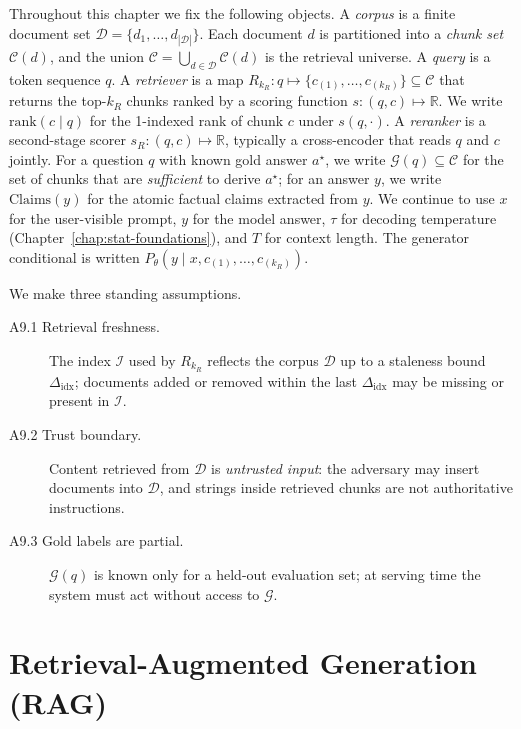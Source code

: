 \begin{notationbox}
Throughout this chapter we fix the following objects. A
\emph{corpus} is a finite document set $\mathcal{D} = \{d_1, \dots, d_{|\mathcal{D}|}\}$.
Each document $d$ is partitioned into a \emph{chunk set}
$\mathcal{C}(d)$, and the union $\mathcal{C} = \bigcup_{d \in \mathcal{D}} \mathcal{C}(d)$
is the retrieval universe. A \emph{query} is a token sequence $q$.
A \emph{retriever} is a map $R_{k_R} : q \mapsto
\{c_{(1)}, \dots, c_{(k_R)}\} \subseteq \mathcal{C}$ that returns
the top-$k_R$ chunks ranked by a scoring function
$s : (q, c) \mapsto \mathbb{R}$. We write $\mathrm{rank}(c \mid q)$ for
the 1-indexed rank of chunk $c$ under $s(q, \cdot)$. A
\emph{reranker} is a second-stage scorer
$s_R : (q, c) \mapsto \mathbb{R}$, typically a cross-encoder that
reads $q$ and $c$ jointly. For a question $q$ with known gold
answer $a^\star$, we write $\mathcal{G}(q) \subseteq \mathcal{C}$ for the
set of chunks that are \emph{sufficient} to derive $a^\star$; for
an answer $y$, we write $\mathrm{Claims}(y)$ for the atomic
factual claims extracted from $y$. We continue to use $x$ for the
user-visible prompt, $y$ for the model answer, $\tau$ for decoding
temperature (Chapter~\ref{chap:stat-foundations}), and $T$ for context length. The generator
conditional is written $P_\theta(y \mid x, c_{(1)}, \dots, c_{(k_R)})$.

We make three standing assumptions.
\begin{description}
  \item[A9.1 Retrieval freshness.] The index $\mathcal{I}$ used by $R_{k_R}$
    reflects the corpus $\mathcal{D}$ up to a staleness bound
    $\Delta_\mathrm{idx}$; documents added or removed within the last
    $\Delta_\mathrm{idx}$ may be missing or present in $\mathcal{I}$.
  \item[A9.2 Trust boundary.] Content retrieved from $\mathcal{D}$ is
    \emph{untrusted input}: the adversary may insert documents into
    $\mathcal{D}$, and strings inside retrieved chunks are not
    authoritative instructions.
  \item[A9.3 Gold labels are partial.] $\mathcal{G}(q)$ is known only for
    a held-out evaluation set; at serving time the system must act
    without access to $\mathcal{G}$.
\end{description}
\end{notationbox}

\section{Retrieval-Augmented Generation (RAG)}

